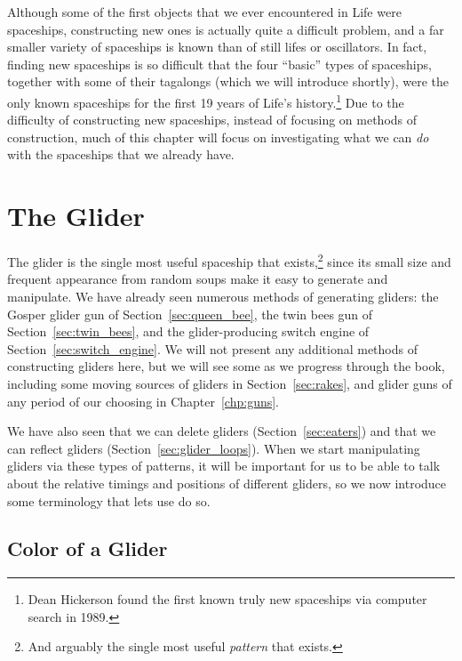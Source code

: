 Although some of the first objects that we ever encountered in Life were spaceships, constructing new ones is actually quite a difficult problem, and a far smaller variety of spaceships is known than of still lifes or oscillators. In fact, finding new spaceships is so difficult that the four ``basic'' types of spaceships, together with some of their tagalongs (which we will introduce shortly), were the only known spaceships for the first 19 years of Life's history.\footnote{Dean Hickerson found the first known truly new spaceships via computer search in 1989.} Due to the difficulty of constructing new spaceships, instead of focusing on methods of construction, much of this chapter will focus on investigating what we can \emph{do} with the spaceships that we already have.



\section{The Glider}\label{sec:glider}

The glider is the single most useful spaceship that exists,\footnote{And arguably the single most useful \emph{pattern} that exists.} since its small size and frequent appearance from random soups make it easy to generate and manipulate. We have already seen numerous methods of generating gliders: the Gosper glider gun of Section~\ref{sec:queen_bee}, the twin bees gun of Section~\ref{sec:twin_bees}, and the glider-producing switch engine of Section~\ref{sec:switch_engine}. We will not present any additional methods of constructing gliders here, but we will see some as we progress through the book, including some moving sources of gliders in Section~\ref{sec:rakes}, and glider guns of any period of our choosing in Chapter~\ref{chp:guns}.

We have also seen that we can delete gliders (Section~\ref{sec:eaters}) and that we can reflect gliders (Section~\ref{sec:glider_loops}). When we start manipulating gliders via these types of patterns, it will be important for us to be able to talk about the relative timings and positions of different gliders, so we now introduce some terminology that lets use do so.


\subsection{Color of a Glider}\label{sec:glider_color}

